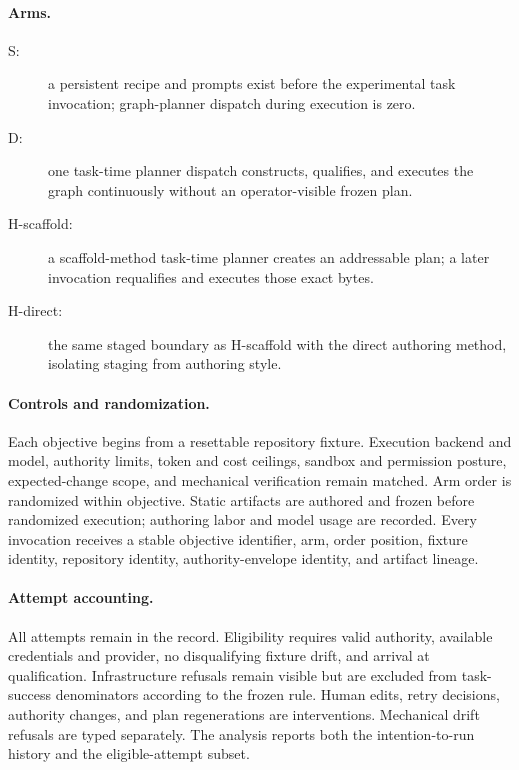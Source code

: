 \documentclass[11pt]{article}
\begin{document}
\paragraph{Arms.}
\begin{description}
  \item[S:] a persistent recipe and prompts exist before the experimental task
  invocation; graph-planner dispatch during execution is zero.
  \item[D:] one task-time planner dispatch constructs, qualifies, and executes
  the graph continuously without an operator-visible frozen plan.
  \item[H-scaffold:] a scaffold-method task-time planner creates an
  addressable plan; a later invocation requalifies and executes those exact
  bytes.
  \item[H-direct:] the same staged boundary as H-scaffold with the direct
  authoring method, isolating staging from authoring style.
\end{description}

\paragraph{Controls and randomization.}
Each objective begins from a resettable repository fixture. Execution backend
and model, authority limits, token and cost ceilings, sandbox and permission
posture, expected-change scope, and mechanical verification remain matched.
Arm order is randomized within objective. Static artifacts are authored and
frozen before randomized execution; authoring labor and model usage are
recorded. Every invocation receives a stable objective identifier, arm,
order position, fixture identity, repository identity, authority-envelope
identity, and artifact lineage.

\paragraph{Attempt accounting.}
All attempts remain in the record. Eligibility requires valid authority,
available credentials and provider, no disqualifying fixture drift, and arrival
at qualification. Infrastructure refusals remain visible but are excluded
from task-success denominators according to the frozen rule. Human edits,
retry decisions, authority changes, and plan regenerations are interventions.
Mechanical drift refusals are typed separately. The analysis reports both the
intention-to-run history and the eligible-attempt subset.
\end{document}

